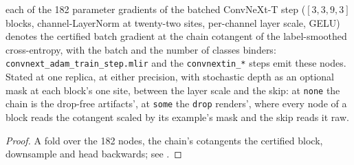 \begin{theorem}
  \label{thm:convnext_step_tie}
  \leanok
  \Prove{} each of the 182 parameter gradients of the batched ConvNeXt-T
  step (\([3, 3, 9, 3]\) blocks, channel-LayerNorm at twenty-two sites,
  per-channel layer scale, GELU) denotes the certified batch gradient at the
  chain cotangent of the label-smoothed cross-entropy, with the batch and the
  number of classes binders: \texttt{convnext\_adam\_train\_step.mlir} and
  the \texttt{convnextin\_*} steps emit these nodes. Stated at one replica,
  at either precision, with stochastic depth as an optional mask at each
  block's one site, between the layer scale and the skip: at \texttt{none}
  the chain is the drop-free artifacts', at \texttt{some} the \texttt{drop}
  renders', where every node of a block reads the cotangent scaled by its
  example's mask and the skip reads it raw.
\end{theorem}

\begin{proof}
\leanok
A fold over the 182 nodes, the chain's cotangents the certified block,
downsample and head backwards; see
.
\end{proof}

